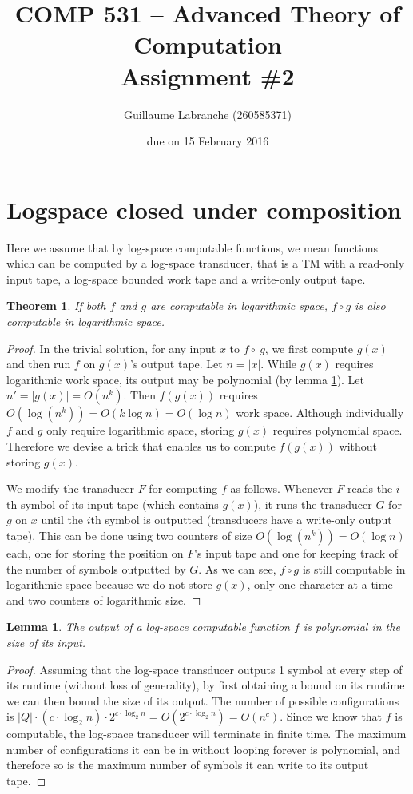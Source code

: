 \documentclass{article}
\author{Guillaume Labranche (260585371)}
\title{COMP 531 -- Advanced Theory of Computation\\Assignment \#2}
\date{due on 15 February 2016}
\newtheorem{theorem}{Theorem}
\newtheorem{lemma}{Lemma}
\begin{document}
\maketitle

\section{Logspace closed under composition}

Here we assume that by log-space computable functions, we mean functions which can be computed by a log-space transducer, that is a TM with a read-only input tape, a log-space bounded work tape and a write-only output tape.

\begin{theorem}If both $f$ and $g$ are computable in logarithmic space, $f \circ g$ is also computable in logarithmic space.
\end{theorem}
\begin{proof} In the trivial solution, for any input $x$ to $f \circ\ g$, we first compute $g(x)$ and then run $f$ on $g(x)$'s output tape. Let $n=|x|$. While $g(x)$ requires logarithmic work space, its output may be polynomial (by lemma \ref{lemma:logspace_polynomial}). Let $n' = |g(x)| = O(n^k)$. Then $f(g(x))$ requires $O(\log(n^k)) = O(k \log n) = O(\log n)$ work space. Although individually $f$ and $g$ only require logarithmic space, storing $g(x)$ requires polynomial space. Therefore we devise a trick that enables us to compute $f(g(x))$ without storing $g(x)$.

We modify the transducer $F$ for computing $f$ as follows. Whenever $F$ reads the $i$th symbol of its input tape (which contains $g(x)$), it runs the transducer $G$ for $g$ on $x$ until the $i$th symbol is outputted (transducers have a write-only output tape). This can be done using two counters of size $O(\log(n^k))=O(\log n)$ each, one for storing the position on $F$'s input tape and one for keeping track of the number of symbols outputted by $G$. As we can see, $f \circ g$ is still computable in logarithmic space because we do not store $g(x)$, only one character at a time and two counters of logarithmic size.
\end{proof}

\begin{lemma}\label{lemma:logspace_polynomial}
The output of a log-space computable function $f$ is polynomial in the size of its input.
\end{lemma}
\begin{proof}
Assuming that the log-space transducer outputs 1 symbol at every step of its runtime (without loss of generality), by first obtaining a bound on its runtime we can then bound the size of its output. The number of possible configurations is $|Q| \cdot (c \cdot \log_2 n) \cdot 2^{c \cdot \log_2 n} = O(2^{c \cdot \log_2 n}) = O(n^c)$. Since we know that $f$ is computable, the log-space transducer will terminate in finite time. The maximum number of configurations it can be in without looping forever is polynomial, and therefore so is the maximum number of symbols it can write to its output tape.
\end{proof}
\end{document}

